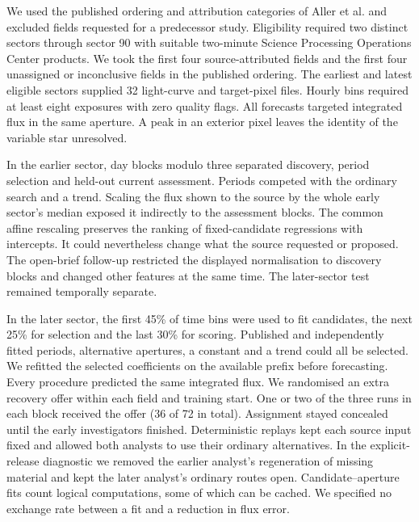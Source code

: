  We used the published ordering and attribution categories of Aller et al. and excluded fields requested for a predecessor study.\cite{ALLER} Eligibility required two distinct sectors through sector 90 with suitable two-minute Science Processing Operations Center products. We took the first four source-attributed fields and the first four unassigned or inconclusive fields in the published ordering. The earliest and latest eligible sectors supplied 32 light-curve and target-pixel files. Hourly bins required at least eight exposures with zero quality flags. All forecasts targeted integrated flux in the same aperture. A peak in an exterior pixel leaves the identity of the variable star unresolved.\cite{PIX}

 In the earlier sector, day blocks modulo three separated discovery, period selection and held-out current assessment. Periods competed with the ordinary search and a trend. Scaling the flux shown to the source by the whole early sector's median exposed it indirectly to the assessment blocks. The common affine rescaling preserves the ranking of fixed-candidate regressions with intercepts. It could nevertheless change what the source requested or proposed. The open-brief follow-up restricted the displayed normalisation to discovery blocks and changed other features at the same time. The later-sector test remained temporally separate.

In the later sector, the first 45\% of time bins were used to fit candidates, the next 25\% for selection and the last 30\% for scoring. Published and independently fitted periods, alternative apertures, a constant and a trend could all be selected. We refitted the selected coefficients on the available prefix before forecasting. Every procedure predicted the same integrated flux. We randomised an extra recovery offer within each field and training start. One or two of the three runs in each block received the offer (36 of 72 in total). Assignment stayed concealed until the early investigators finished. Deterministic replays kept each source input fixed and allowed both analysts to use their ordinary alternatives. In the explicit-release diagnostic we removed the earlier analyst's regeneration of missing material and kept the later analyst's ordinary routes open. Candidate--aperture fits count logical computations, some of which can be cached. We specified no exchange rate between a fit and a reduction in flux error.

